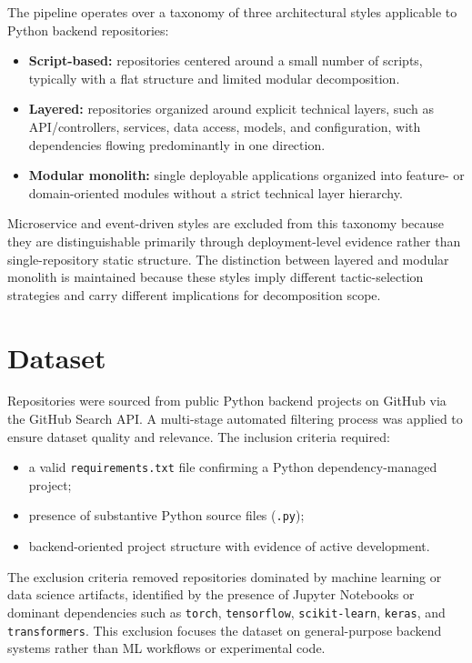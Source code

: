 The pipeline operates over a taxonomy of three architectural styles applicable to Python backend repositories:

\begin{itemize}
    \item \textbf{Script-based:} repositories centered around a small number of scripts, typically with a flat structure and limited modular decomposition.
    \item \textbf{Layered:} repositories organized around explicit technical layers, such as API/controllers, services, data access, models, and configuration, with dependencies flowing predominantly in one direction.
    \item \textbf{Modular monolith:} single deployable applications organized into feature- or domain-oriented modules without a strict technical layer hierarchy.
\end{itemize}

Microservice and event-driven styles are excluded from this taxonomy because they are distinguishable primarily through deployment-level evidence rather than single-repository static structure. The distinction between layered and modular monolith is maintained because these styles imply different tactic-selection strategies and carry different implications for decomposition scope.

\section{Dataset}
\label{sec:met_dataset}

Repositories were sourced from public Python backend projects on GitHub via the GitHub Search API. A multi-stage automated filtering process was applied to ensure dataset quality and relevance. The inclusion criteria required:

\begin{itemize}
    \item a valid \texttt{requirements.txt} file confirming a Python dependency-managed project;
    \item presence of substantive Python source files (\texttt{.py});
    \item backend-oriented project structure with evidence of active development.
\end{itemize}

The exclusion criteria removed repositories dominated by machine learning or data science artifacts, identified by the presence of Jupyter Notebooks or dominant dependencies such as \texttt{torch}, \texttt{tensorflow}, \texttt{scikit-learn}, \texttt{keras}, and \texttt{transformers}. This exclusion focuses the dataset on general-purpose backend systems rather than ML workflows or experimental code.

